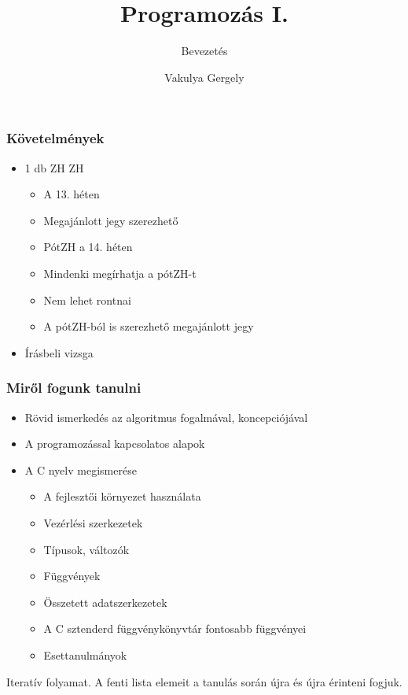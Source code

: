 \documentclass[
	11pt, %
]{beamer}
\title[Short Title]{Programozás I.}
\subtitle{Bevezetés}
\author{Vakulya Gergely}
\institute[UC]{Óbudai Egyetem, AMK \\ \smallskip \textit{vakulya.gergely@amk.uni-obuda.hu}}
\date{}
\begin{document}
\begin{frame}

  \titlepage

\end{frame}

\begin{frame}
  \frametitle{Követelmények}

  \begin{itemize}
    \item{1 db ZH ZH}
      \begin{itemize}
        \item{A 13. héten}
        \item{Megajánlott jegy szerezhető}
        \item{PótZH a 14. héten}
        \item{Mindenki megírhatja a pótZH-t}
        \item{Nem lehet rontnai}
        \item{A pótZH-ból is szerezhető megajánlott jegy}
      \end{itemize}
    \item{Írásbeli vizsga}
  \end{itemize}

\end{frame}

\begin{frame}
  \frametitle{Miről fogunk tanulni}

  \begin{itemize}
    \item{Rövid ismerkedés az algoritmus fogalmával, koncepciójával}
    \item{A programozással kapcsolatos alapok}
    \item{A C nyelv megismerése}
      \begin{itemize}
        \item{A fejlesztői környezet használata}
        \item{Vezérlési szerkezetek}
        \item{Típusok, változók}
        \item{Függvények}
        \item{Összetett adatszerkezetek}
        \item{A C sztenderd függvénykönyvtár fontosabb függvényei}
        \item{Esettanulmányok}
      \end{itemize}
  \end{itemize}

  Iteratív folyamat. A fenti lista elemeit a tanulás során újra és újra érinteni fogjuk.

\end{frame}
\end{document}
